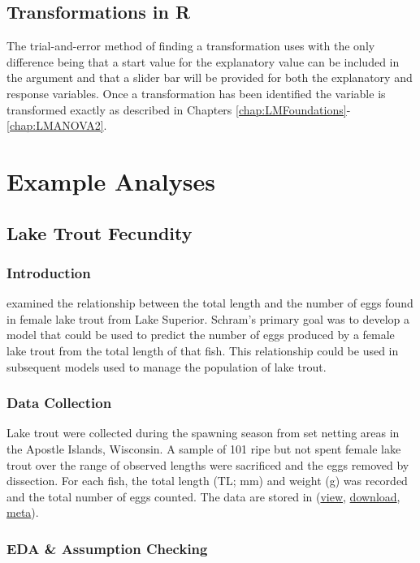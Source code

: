\documentclass[10pt,openany]{book}\usepackage[]{graphicx}\usepackage[]{color}
\begin{document}
\subsection{Transformations in R}
The trial-and-error method of finding a transformation uses  with the only difference being that a start value for the explanatory value can be included in the  argument and that a slider bar will be provided for both the explanatory and response variables.  Once a transformation has been identified the variable is transformed exactly as described in Chapters \ref{chap:LMFoundations}-\ref{chap:LMANOVA2}.


\section{Example Analyses}
\subsection{Lake Trout Fecundity}
\subsubsection*{Introduction}
\cite{Schram1993} examined the relationship between the total length and the number of eggs found in female lake trout from Lake Superior.  Schram's primary goal was to develop a model that could be used to predict the number of eggs produced by a female lake trout from the total length of that fish.  This relationship could be used in subsequent models used to manage the population of lake trout.

\subsubsection*{Data Collection}
Lake trout were collected during the spawning season from set netting areas in the Apostle Islands, Wisconsin.  A sample of 101 ripe but not spent female lake trout over the range of observed lengths were sacrificed and the eggs removed by dissection.  For each fish, the total length (TL; mm) and weight (g) was recorded and the total number of eggs counted.  The data are stored in  (\href{https://github.com/droglenc/NCData/blob/master/LakeTroutEggs.csv}{view}, \href{https://raw.githubusercontent.com/droglenc/NCData/master/LakeTroutEggs.csv}{download}, \href{https://github.com/droglenc/NCData/blob/master/LakeTroutEggs_meta.txt}{meta}).

\subsubsection*{EDA \& Assumption Checking}
\end{document}
